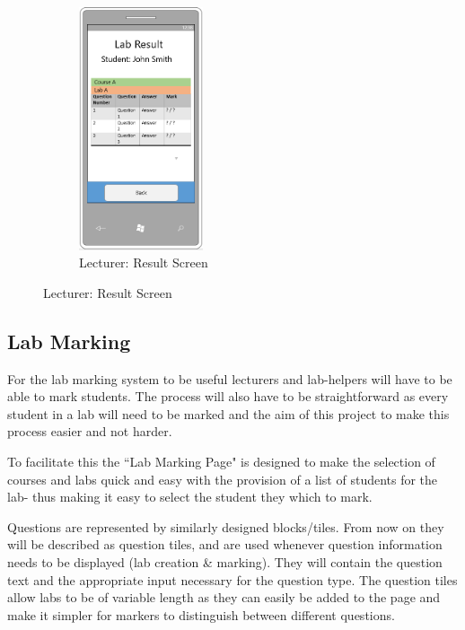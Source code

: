 \documentclass[11pt]{report}
\begin{document}
\begin{figure}[H]
\begin{subfigure}[c]{0.3\textwidth}
    \label{fig:design-result-select-mb}
\end{subfigure}
\hfill
\begin{subfigure}[c]{0.3\textwidth}
    \centering
    \includegraphics[width=0.4\textwidth]{images/design/result-lecturer-mobile.png}
    \caption{Lecturer: Result Screen}
    \label{fig:design-result-lecturer-mb}
\end{subfigure}
\end{figure}




\subsection{Lab Marking}
For the lab marking system to be useful lecturers and lab-helpers will have to be able to mark students. The process will also have to be straightforward as every student in a lab will need to be marked and the aim of this project to make this process easier and not harder. 

To facilitate this the ``Lab Marking Page" is designed to make  the selection of courses and labs quick and easy with the provision of a list of students for the lab- thus making it easy to select the student they which to mark.

Questions are represented by similarly designed blocks/tiles. From now on they will be described as question tiles, and are used whenever question information needs to be displayed (lab creation \& marking). They will contain the question text and the appropriate input necessary for the question type. The question tiles allow labs to be of variable length as they can easily be added to the page and make it simpler for markers to distinguish between different questions.
\end{document}
